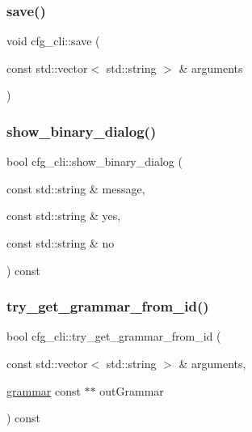 \mbox{\label{classcfg__cli_ab4206d3ef9d20e52d6592c44dc85979e}} 
\subsubsection{\texorpdfstring{save()}{save()}}
{\footnotesize\ttfamily void cfg\+\_\+cli\+::save (\begin{DoxyParamCaption}\item[{const std\+::vector$<$ std\+::string $>$ \&}]{arguments }\end{DoxyParamCaption})}

\mbox{\label{classcfg__cli_a83a18d4e3a5bfe9ccba1912b2cbbda18}} 
\subsubsection{\texorpdfstring{show\_binary\_dialog()}{show\_binary\_dialog()}}
{\footnotesize\ttfamily bool cfg\+\_\+cli\+::show\+\_\+binary\+\_\+dialog (\begin{DoxyParamCaption}\item[{const std\+::string \&}]{message,  }\item[{const std\+::string \&}]{yes,  }\item[{const std\+::string \&}]{no }\end{DoxyParamCaption}) const}

\mbox{\label{classcfg__cli_ab0f5ffb557534426d320cf66d3d765eb}} 
\subsubsection{\texorpdfstring{try\_get\_grammar\_from\_id()}{try\_get\_grammar\_from\_id()}}
{\footnotesize\ttfamily bool cfg\+\_\+cli\+::try\+\_\+get\+\_\+grammar\+\_\+from\+\_\+id (\begin{DoxyParamCaption}\item[{const std\+::vector$<$ std\+::string $>$ \&}]{arguments,  }\item[{\mbox{\hyperlink{classgrammar}{grammar}} const $\ast$$\ast$}]{out\+Grammar }\end{DoxyParamCaption}) const}


